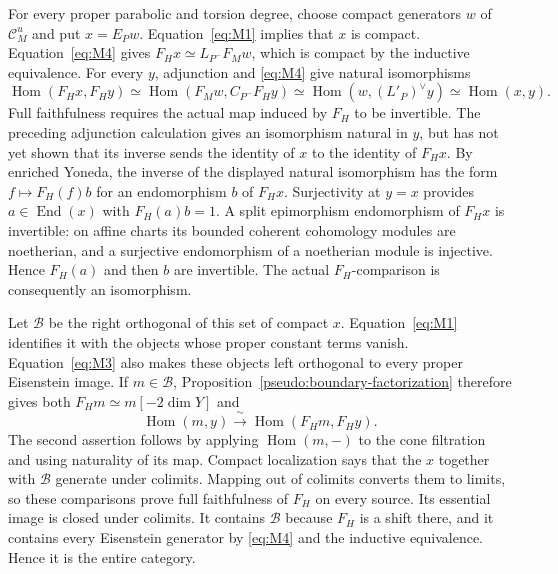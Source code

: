 \documentclass[11pt]{article}
\numberwithin{equation}{section}
\theoremstyle{definition}
\theoremstyle{remark}
\begin{document}
For every proper parabolic and torsion degree, choose compact generators
$w$ of $\mathcal C_M^u$ and put $x=E_Pw$.  Equation~\eqref{eq:M1} implies
that $x$ is compact.  Equation~\eqref{eq:M4} gives
$F_Hx\simeq L_{P^-}F_Mw$, which is compact by the inductive equivalence.
For every $y$, adjunction and \eqref{eq:M4} give natural isomorphisms
\[
 \operatorname{Hom}(F_Hx,F_Hy)
 \simeq \operatorname{Hom}(F_Mw,C_{P^-}F_Hy)
 \simeq \operatorname{Hom}(w,(L'_P)^\vee y)
 \simeq \operatorname{Hom}(x,y).
\]
Full faithfulness requires the actual map induced by $F_H$ to be
invertible.  The preceding adjunction calculation gives an isomorphism
natural in $y$, but has not yet shown that its inverse sends the identity
of $x$ to the identity of $F_Hx$.  By enriched
Yoneda, the inverse of the displayed natural isomorphism has the form
$f\mapsto F_H(f)b$ for an endomorphism $b$ of $F_Hx$.  Surjectivity at $y=x$
provides $a\in\operatorname{End}(x)$ with $F_H(a)b=1$.  A split epimorphism
endomorphism of $F_Hx$ is invertible: on affine charts its bounded coherent
cohomology modules are noetherian, and a surjective endomorphism of a
noetherian module is injective.  Hence $F_H(a)$ and then $b$ are invertible.
The actual $F_H$-comparison is consequently an isomorphism.

Let $\mathcal B$ be the right orthogonal of this set of compact $x$.
Equation~\eqref{eq:M1} identifies it with the objects whose proper
constant terms vanish.  Equation~\eqref{eq:M3} also makes these objects
left orthogonal to every proper Eisenstein image.  If $m\in\mathcal B$,
Proposition~\ref{pseudo:boundary-factorization} therefore gives both
$F_Hm\simeq m[-2\dim Y]$ and
\[
 \operatorname{Hom}(m,y)\xrightarrow{\ \sim\ }
 \operatorname{Hom}(F_Hm,F_Hy).
\]
The second assertion follows by applying $\operatorname{Hom}(m,-)$ to
the cone filtration and using naturality of its map.  Compact localization
says that the $x$ together with $\mathcal B$ generate under colimits.
Mapping out of colimits converts them to limits, so these comparisons
prove full faithfulness of $F_H$ on every source.  Its essential image is
closed under colimits.  It contains $\mathcal B$ because $F_H$ is a shift
there, and it contains every Eisenstein generator by \eqref{eq:M4} and
the inductive equivalence.  Hence it is the entire category.
\end{document}
